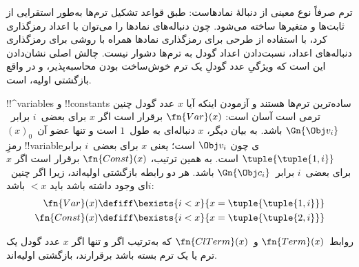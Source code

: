 \documentclass[../../../include/open-logic-section]{subfiles}
\begin{document}

\begin{explain}
ترم صرفاً نوع معینی از دنبالهٔ نمادهاست: طبق قواعد تشکیل ترم‌ها به‌طور
استقرایی از ثابت‌ها و متغیرها ساخته می‌شود. چون دنباله‌های نمادها را
می‌توان با اعداد رمزگذاری کرد، با استفاده از طرحی برای رمزگذاری
نمادها همراه با روشی برای رمزگذاری دنباله‌های اعداد، نسبت‌دادن اعداد
گودل به ترم‌ها دشوار نیست. چالش اصلی نشان‌دادن این است که ویژگیِ عدد
گودلِ یک ترم خوش‌ساخت بودن محاسبه‌پذیر، و در واقع بازگشتی اولیه، است.
\end{explain}

!!^{variable}s و !!{constant}s ساده‌ترین ترم‌ها هستند و آزمودن اینکه آیا
$x$ عدد گودل چنین ترمی است آسان است: $\fn{Var}(x)$ برقرار است اگر
$x$ برای بعضی~$i$ برابر~$\Gn{\Obj v_i}$ باشد. به بیان دیگر، $x$
دنباله‌ای به طول~$1$ است و تنها عضو آن~$(x)_0$ رمزِ !!{variable}ی چون
$\Obj v_i$ است؛ یعنی $x$ برای بعضی~$i$ برابر
$\tuple{\tuple{1,i}}$ است. به همین ترتیب، $\fn{Const}(x)$ برقرار است
اگر $x$ برای بعضی~$i$ برابر~$\Gn{\Obj c_i}$ باشد. هر دو رابطه
بازگشتی اولیه‌اند، زیرا اگر چنین~$i$ای وجود داشته باشد باید $<x$
باشد:
\begin{align*}
  \fn{Var}(x) & \defiff \bexists{i<x}{x = \tuple{\tuple{1, i}}}\\
  \fn{Const}(x) & \defiff \bexists{i<x}{x = \tuple{\tuple{2, i}}}
\end{align*}

\begin{prop}
روابط~$\fn{Term}(x)$ و~$\fn{ClTerm}(x)$ که به‌ترتیب اگر و تنها اگر
$x$ عدد گودل یک ترم یا یک ترم بسته باشد برقرارند، بازگشتی اولیه‌اند.
\end{prop}
\end{document}
